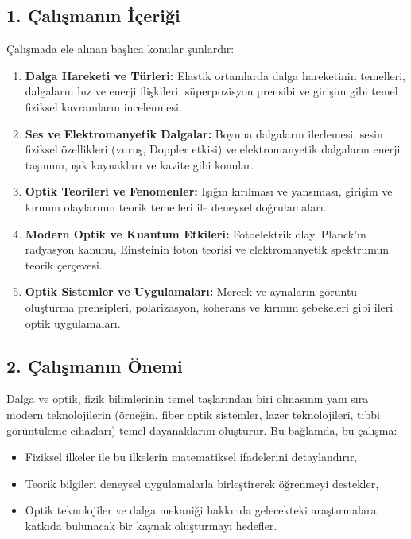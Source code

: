 \documentclass[11pt,letterpaper,twocolumn]{article}
\begin{document}
\begin{@twocolumnfalse}
\begin{center}
\subsection*{1. Çalışmanın İçeriği}
\justifying
Çalışmada ele alınan başlıca konular şunlardır:
\begin{enumerate}[label=\textbf{\arabic*.},leftmargin=1cm]
    \item \textbf{Dalga Hareketi ve Türleri:} Elastik ortamlarda dalga hareketinin temelleri, dalgaların hız ve enerji ilişkileri, süperpozisyon prensibi ve girişim gibi temel fiziksel kavramların incelenmesi.
    \item \textbf{Ses ve Elektromanyetik Dalgalar:} Boyuna dalgaların ilerlemesi, sesin fiziksel özellikleri (vuruş, Doppler etkisi) ve elektromanyetik dalgaların enerji taşınımı, ışık kaynakları ve kavite gibi konular.
    \item \textbf{Optik Teorileri ve Fenomenler:} Işığın kırılması ve yansıması, girişim ve kırınım olaylarının teorik temelleri ile deneysel doğrulamaları.
    \item \textbf{Modern Optik ve Kuantum Etkileri:} Fotoelektrik olay, Planck’ın radyasyon kanunu, Einsteinin foton teorisi ve elektromanyetik spektrumun teorik çerçevesi.
    \item \textbf{Optik Sistemler ve Uygulamaları:} Mercek ve aynaların görüntü oluşturma prensipleri, polarizasyon, koherans ve kırınım şebekeleri gibi ileri optik uygulamaları.
\end{enumerate}

\subsection*{2. Çalışmanın Önemi}
\justifying
Dalga ve optik, fizik bilimlerinin temel taşlarından biri olmasının yanı sıra modern teknolojilerin (örneğin, fiber optik sistemler, lazer teknolojileri, tıbbi görüntüleme cihazları) temel dayanaklarını oluşturur. Bu bağlamda, bu çalışma:
\begin{itemize}[leftmargin=1cm]
    \item Fiziksel ilkeler ile bu ilkelerin matematiksel ifadelerini detaylandırır,
    \item Teorik bilgileri deneysel uygulamalarla birleştirerek öğrenmeyi destekler,
    \item Optik teknolojiler ve dalga mekaniği hakkında gelecekteki araştırmalara katkıda bulunacak bir kaynak oluşturmayı hedefler.
\end{itemize}


\end{center}
\end{@twocolumnfalse}
\end{document}
